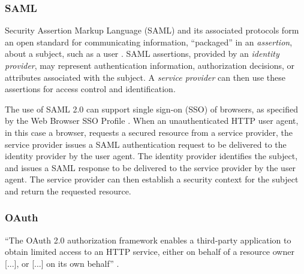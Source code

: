 \subsubsection{SAML}
Security Assertion Markup Language (SAML) and its associated protocols form an open standard for communicating information, ``packaged'' in an \emph{assertion}, about a subject, such as a user \autocite{Kemp2005}. SAML assertions, provided by an \emph{identity provider}, may represent authentication information, authorization decisions, or attributes associated with the subject. A \emph{service provider} can then use these assertions for access control and identification.

The use of SAML 2.0 can support single sign-on (SSO) of browsers, as specified by the Web Browser SSO Profile \autocite{Hughes2005}. When an unauthenticated HTTP user agent, in this case a browser, requests a secured resource from a service provider, the service provider issues a SAML authentication request to be delivered to the identity provider by the user agent. The identity provider identifies the subject, and issues a SAML response to be delivered to the service provider by the user agent. The service provider can then establish a security context for the subject and return the requested resource. 

\subsubsection{OAuth}
``The OAuth 2.0 authorization framework enables a third-party
application to obtain limited access to an HTTP service, either on
behalf of a resource owner [...], or [...] on its own behalf'' \autocite{Hardt2023}.

